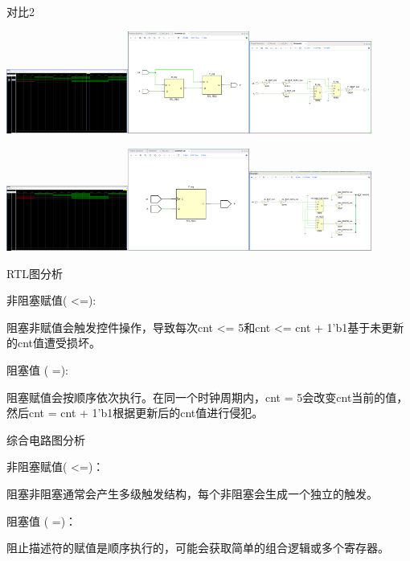 \documentclass{article} %
\begin{document}
$$
$$
对比2\par
\includegraphics[width=0.3\textwidth]{nonex21.png}\includegraphics[width=0.3\textwidth]{nonex22.png}\includegraphics[width=0.3\textwidth]{nonex23.png}\par
\includegraphics[width=0.3\textwidth]{ex21.png}\includegraphics[width=0.3\textwidth]{ex22.png}\includegraphics[width=0.3\textwidth]{new.png}\par
$$
$$
RTL图分析\par
非阻塞赋值( <=):\par
阻塞非赋值会触发控件操作，导致每次cnt <= 5和cnt <= cnt + 1'b1基于未更新的cnt值遭受损坏。\par
阻塞值 ( =):\par
阻塞赋值会按顺序依次执行。在同一个时钟周期内，cnt = 5会改变cnt当前的值，然后cnt = cnt + 1'b1根据更新后的cnt值进行侵犯。\par
综合电路图分析\par
非阻塞赋值( <=)：\par
阻塞非阻塞通常会产生多级触发结构，每个非阻塞会生成一个独立的触发。\par
阻塞值 ( =)：\par
阻止描述符的赋值是顺序执行的，可能会获取简单的组合逻辑或多个寄存器。\par
\end{document}
